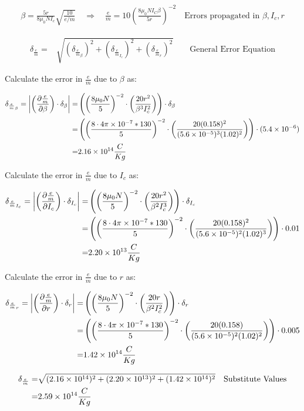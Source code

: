 \documentclass[12pt]{article}
\newcommand{\paren}[1]{\left( {#1} \right)}
\newcommand{\abs}[1]{\left| {#1} \right|}
\begin{document}
\begin{align}
	\beta = \frac{5r}{8\mu_0N I_c}\sqrt{\frac{10}{e/m}}
	\quad \Rightarrow \quad
	\frac{e}{m}=10\paren{\frac{8\mu_0N I_C\beta}{5r}}^{-2}
	\quad \text{Errors propagated in }\beta, I_c, r
	\label{e:em_derive_FixA}
\end{align}

\begin{align}
	\delta_\frac{e}{m}=&\sqrt{\paren{\delta_{\frac{e}{m}_\beta}}^2+\paren{\delta_{\frac{e}{m}_{I_c}}}^2+\paren{\delta_{\frac{e}{m}_r}}^2} \qquad \text{General Error Equation} \label{e:FixA_err}
\end{align}

Calculate the error in $\frac{e}{m}$ due to $\beta$ as:

\begin{align}
	\delta_{\frac{e}{m}_\beta} = \abs{\paren{\frac{\partial \frac{e}{m}}{\partial \beta}}\cdot\delta_\beta} =& \paren{\paren{\frac{8\mu_0N}{5}}^{-2}\cdot\paren{\frac{20r^2}{\beta^3I_c^2}}}\cdot\delta_\beta \label{e:FixA_err_beta} \\
	=& \paren{\paren{\frac{8\cdot4\pi\times10^{-7}*130}{5}}^{-2}\cdot\paren{\frac{20(0.158)^2}{(5.6\times10^{-5})^3(1.02)^2}}}\cdot(5.4\times10^{-6}) \notag \\
	=& 2.16\times10^{14} \frac{C}{Kg} \notag
\end{align}

Calculate the error in $\frac{e}{m}$ due to $I_c$ as:

\begin{align}
	\delta_{\frac{e}{m}_{I_c}} = \abs{\paren{\frac{\partial \frac{e}{m}}{\partial I_c}}\cdot\delta_{I_c}} =& \paren{\paren{\frac{8\mu_0N}{5}}^{-2}\cdot\paren{\frac{20r^2}{\beta^2I_c^3}}}\cdot \delta_{I_c} \label{e:FixA_err_Ic} \\
	=& \paren{\paren{\frac{8\cdot4\pi\times10^{-7}*130}{5}}^{-2}\cdot\paren{\frac{20(0.158)^2}{(5.6\times10^{-5})^2(1.02)^3}}}\cdot0.01 \notag \\
	=& 2.20\times10^{13} \frac{C}{Kg} \notag
\end{align}

Calculate the error in $\frac{e}{m}$ due to $r$ as:

\begin{align}
	\delta_{\frac{e}{m}_r} = \abs{\paren{\frac{\partial \frac{e}{m}}{\partial r}}\cdot\delta_r} =& \paren{\paren{\frac{8\mu_0N}{5}}^{-2}\cdot\paren{\frac{20r}{\beta^2I_c^2}}}\cdot \delta_r \label{e:FixA_err_r} \\
	=& \paren{\paren{\frac{8\cdot4\pi\times10^{-7}*130}{5}}^{-2}\cdot\paren{\frac{20(0.158)}{(5.6\times10^{-5})^2(1.02)^2}}}\cdot0.005 \notag \\
	=& 1.42\times10^{14} \frac{C}{Kg} \notag
\end{align}

\begin{align}
	\delta_\frac{e}{m} =& \sqrt{(2.16\times10^{14})^2+(2.20\times10^{13})^2+(1.42\times10^{14})^2} && \text{Substitute Values} \notag \\
	=& 2.59\times10^{14} \frac{C}{Kg} \label{v:FixA_err}
\end{align}
\end{document}
